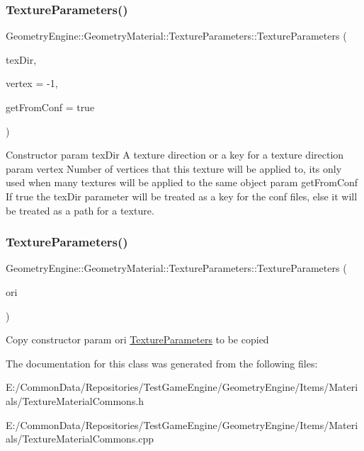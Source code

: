 \subsubsection{\texorpdfstring{TextureParameters()}{TextureParameters()}\hspace{0.1cm}{\footnotesize\ttfamily [1/2]}}
{\footnotesize\ttfamily Geometry\+Engine\+::\+Geometry\+Material\+::\+Texture\+Parameters\+::\+Texture\+Parameters (\begin{DoxyParamCaption}\item[{const std\+::string \&}]{tex\+Dir,  }\item[{int}]{vertex = {\ttfamily -\/1},  }\item[{bool}]{get\+From\+Conf = {\ttfamily true} }\end{DoxyParamCaption})}

Constructor param tex\+Dir A texture direction or a key for a texture direction param vertex Number of vertices that this texture will be applied to, its only used when many textures will be applied to the same object param get\+From\+Conf If true the tex\+Dir parameter will be treated as a key for the conf files, else it will be treated as a path for a texture. \mbox{\label{class_geometry_engine_1_1_geometry_material_1_1_texture_parameters_abbda2d6bc0bfc273cd8454acc8b326b7}} 
\subsubsection{\texorpdfstring{TextureParameters()}{TextureParameters()}\hspace{0.1cm}{\footnotesize\ttfamily [2/2]}}
{\footnotesize\ttfamily Geometry\+Engine\+::\+Geometry\+Material\+::\+Texture\+Parameters\+::\+Texture\+Parameters (\begin{DoxyParamCaption}\item[{const \mbox{\hyperlink{class_geometry_engine_1_1_geometry_material_1_1_texture_parameters}{Texture\+Parameters}} \&}]{ori }\end{DoxyParamCaption})}

Copy constructor param ori \mbox{\hyperlink{class_geometry_engine_1_1_geometry_material_1_1_texture_parameters}{Texture\+Parameters}} to be copied 

The documentation for this class was generated from the following files\+:\begin{DoxyCompactItemize}
\item 
E\+:/\+Common\+Data/\+Repositories/\+Test\+Game\+Engine/\+Geometry\+Engine/\+Items/\+Materials/Texture\+Material\+Commons.\+h\item 
E\+:/\+Common\+Data/\+Repositories/\+Test\+Game\+Engine/\+Geometry\+Engine/\+Items/\+Materials/Texture\+Material\+Commons.\+cpp\end{DoxyCompactItemize}
